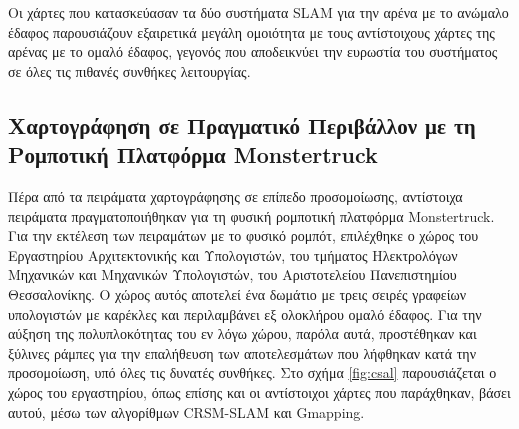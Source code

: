 \bigskip
Οι χάρτες που κατασκεύασαν τα δύο συστήματα SLAM για την αρένα με το ανώμαλο έδαφος παρουσιάζουν εξαιρετικά μεγάλη ομοιότητα με τους αντίστοιχους χάρτες της αρένας με το ομαλό έδαφος, γεγονός που αποδεικνύει την ευρωστία του συστήματος σε όλες τις πιθανές συνθήκες λειτουργίας.

\subsection{Χαρτογράφηση σε Πραγματικό Περιβάλλον με τη Ρομποτική Πλατφόρμα Monstertruck}
Πέρα από τα πειράματα χαρτογράφησης σε επίπεδο προσομοίωσης, αντίστοιχα πειράματα πραγματοποιήθηκαν για τη φυσική ρομποτική πλατφόρμα Monstertruck. Για την εκτέλεση των πειραμάτων με το φυσικό ρομπότ, επιλέχθηκε ο χώρος του {Εργαστηρίου Αρχιτεκτονικής και Υπολογιστών}, του τμήματος Ηλεκτρολόγων Μηχανικών και Μηχανικών Υπολογιστών, του Αριστοτελείου Πανεπιστημίου Θεσσαλονίκης. Ο χώρος αυτός αποτελεί ένα δωμάτιο με τρεις σειρές γραφείων υπολογιστών με καρέκλες και περιλαμβάνει εξ ολοκλήρου ομαλό έδαφος. Για την αύξηση της πολυπλοκότητας του εν λόγω χώρου, παρόλα αυτά, προστέθηκαν και ξύλινες ράμπες για την επαλήθευση των αποτελεσμάτων που λήφθηκαν κατά την προσομοίωση, υπό όλες τις δυνατές συνθήκες.  Στο σχήμα \ref{fig:csal} παρουσιάζεται ο χώρος του εργαστηρίου, όπως επίσης και οι αντίστοιχοι χάρτες που παράχθηκαν, βάσει αυτού, μέσω των αλγορίθμων CRSM-SLAM και Gmapping.

